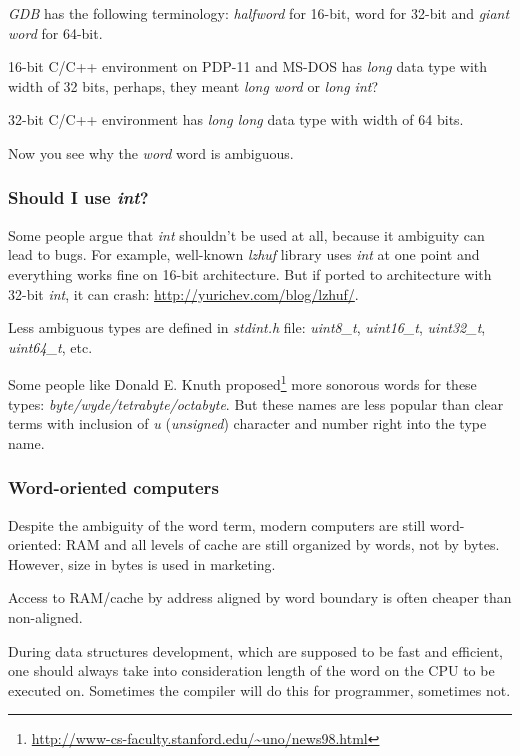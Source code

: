 \emph{GDB} has the following terminology: \emph{halfword} for 16-bit, \gls{word} for 32-bit and \emph{giant word} for 64-bit.

16-bit C/C++ environment on PDP-11 and MS-DOS has \emph{long} data type with width of 32 bits, perhaps,
they meant \emph{long word} or \emph{long int}?

32-bit C/C++ environment has \emph{long long} data type with width of 64 bits.

Now you see why the \emph{word} word is ambiguous.

\subsubsection{Should I use \emph{int}?}

Some people argue that \emph{int} shouldn't be used at all, because it ambiguity can lead to bugs.
For example, well-known \emph{lzhuf} library uses \emph{int} at one point and everything works fine on 16-bit architecture.
But if ported to architecture with 32-bit \emph{int}, it can crash: \url{http://yurichev.com/blog/lzhuf/}.

Less ambiguous types are defined in \emph{stdint.h} file:
\emph{uint8\_t}, \emph{uint16\_t}, \emph{uint32\_t}, \emph{uint64\_t}, etc.

Some people like Donald E. Knuth proposed\footnote{\url{http://www-cs-faculty.stanford.edu/~uno/news98.html}}
more sonorous words
for these types: \emph{byte/wyde/tetrabyte/octabyte}.
But these names are less popular than clear terms with inclusion of \emph{u} (\emph{unsigned}) character 
and number right into the type name.

\subsubsection{Word-oriented computers}

Despite the ambiguity of the \gls{word} term, modern computers are still word-oriented: \ac{RAM} and all levels of cache
are still organized by words, not by bytes.
However, size in bytes is used in marketing.

Access to RAM/cache by address aligned by word boundary is often cheaper than non-aligned.

During data structures development, which are supposed to be fast and efficient,
one should always take into consideration length of the \gls{word} on the CPU to be executed on.
Sometimes the compiler will do this for programmer, sometimes not.

